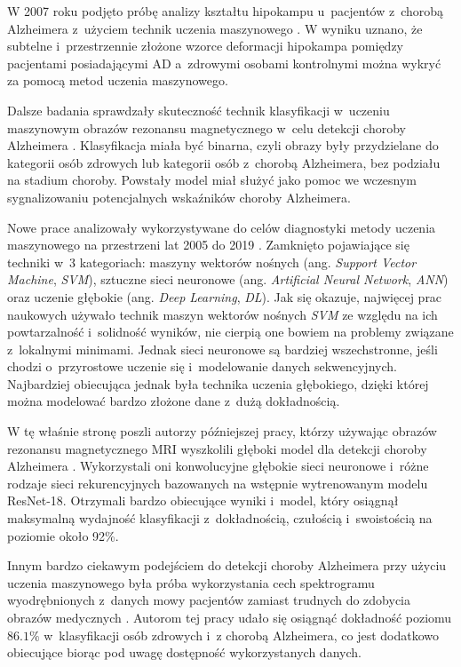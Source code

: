 W 2007 roku podjęto próbę analizy kształtu hipokampu u~pacjentów z~chorobą Alzheimera z~użyciem technik uczenia maszynowego \cite{li2007hippocampal}.
W wyniku uznano, że subtelne i~przestrzennie złożone wzorce deformacji hipokampa pomiędzy pacjentami posiadającymi AD a~zdrowymi osobami kontrolnymi można wykryć za pomocą metod uczenia maszynowego.

Dalsze badania sprawdzały skuteczność technik klasyfikacji w~uczeniu maszynowym obrazów rezonansu magnetycznego w~celu detekcji choroby Alzheimera \cite{herrera2013classification}.
Klasyfikacja miała być binarna, czyli obrazy były przydzielane do kategorii osób zdrowych lub kategorii osób z~chorobą Alzheimera, bez podziału na stadium choroby.
Powstały model miał służyć jako pomoc we wczesnym sygnalizowaniu potencjalnych wskaźników choroby Alzheimera.

Nowe prace analizowały wykorzystywane do celów diagnostyki metody uczenia maszynowego na przestrzeni lat 2005 do 2019 \cite{tanveer2020machine}.
Zamknięto pojawiające się techniki w~3 kategoriach: maszyny wektorów nośnych (ang. \emph{Support Vector Machine}, \emph{SVM}), sztuczne sieci neuronowe (ang. \emph{Artificial Neural Network}, \emph{ANN}) oraz uczenie głębokie (ang. \emph{Deep Learning}, \emph{DL}).
Jak się okazuje, najwięcej prac naukowych używało technik maszyn wektorów nośnych \emph{SVM} ze względu na ich powtarzalność i~solidność wyników, nie cierpią one bowiem na problemy związane z~lokalnymi minimami.
Jednak sieci neuronowe są bardziej wszechstronne, jeśli chodzi o~przyrostowe uczenie się i~modelowanie danych sekwencyjnych.
Najbardziej obiecująca jednak była technika uczenia głębokiego, dzięki której można modelować bardzo złożone dane z~dużą dokładnością.

W tę właśnie stronę poszli autorzy późniejszej pracy, którzy używając obrazów rezonansu magnetycznego MRI wyszkolili głęboki model dla detekcji choroby Alzheimera \cite{ebrahimi2021deep}.
Wykorzystali oni konwolucyjne głębokie sieci neuronowe i~różne rodzaje sieci rekurencyjnych bazowanych na wstępnie wytrenowanym modelu ResNet-18.
Otrzymali bardzo obiecujące wyniki i~model, który osiągnął maksymalną wydajność klasyfikacji z~dokładnością, czułością i~swoistością na poziomie około 92\%.

Innym bardzo ciekawym podejściem do detekcji choroby Alzheimera przy użyciu uczenia maszynowego była próba wykorzystania cech spektrogramu wyodrębnionych z~danych mowy pacjentów zamiast trudnych do zdobycia obrazów medycznych \cite{liu2020new}.
Autorom tej pracy udało się osiągnąć dokładność poziomu $86.1\%$ w~klasyfikacji osób zdrowych i~z chorobą Alzheimera, co jest dodatkowo obiecujące biorąc pod uwagę dostępność wykorzystanych danych.

